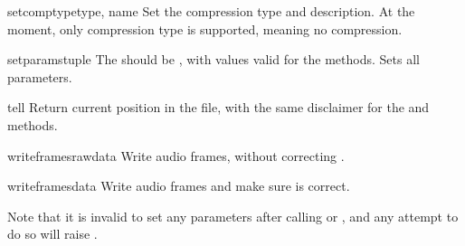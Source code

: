 \begin{methoddesc}{setcomptype}{type, name}
Set the compression type and description.
At the moment, only compression type  is supported,
meaning no compression.
\end{methoddesc}

\begin{methoddesc}{setparams}{tuple}
The  should be , with
values valid for the  methods.  Sets all parameters.
\end{methoddesc}

\begin{methoddesc}{tell}{}
Return current position in the file, with the same disclaimer for
the  and 
methods.
\end{methoddesc}

\begin{methoddesc}{writeframesraw}{data}
Write audio frames, without correcting .
\end{methoddesc}

\begin{methoddesc}{writeframes}{data}
Write audio frames and make sure  is correct.
\end{methoddesc}

Note that it is invalid to set any parameters after calling
 or , and any attempt
to do so will raise .
